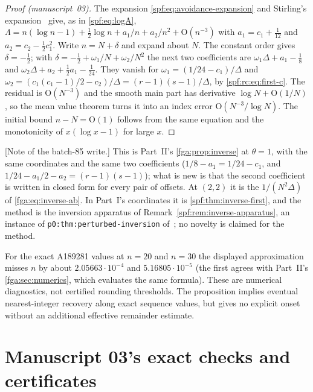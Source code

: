 \documentclass[11pt]{article}
\numberwithin{equation}{section}
\theoremstyle{definition}
\theoremstyle{remark}
\theoremstyle{definition}
\newcommand{\bigO}{\mathrm O}
\begin{document}
\begin{proof}[Proof (manuscript~03)]
The expansion \eqref{spf:eq:avoidance-expansion} and Stirling's
expansion~\cite{dlmfGamma} give, as in \eqref{spf:eq:logA},
$\Lambda=n(\log n-1)+\frac12\log n+a_1/n+a_2/n^2+\bigO(n^{-3})$ with
$a_1=c_1+\frac1{12}$ and $a_2=c_2-\frac12c_1^2$. Write $n=N+\delta$ and
expand about $N$. The constant order gives $\delta=-\frac12$; with
$\delta=-\frac12+\omega_1/N+\omega_2/N^2$ the next two coefficients are
$\omega_1\Delta+a_1-\frac18$ and $\omega_2\Delta+a_2+\frac12a_1-\frac1{24}$.
They vanish for $\omega_1=(1/24-c_1)/\Delta$ and
$\omega_2=(c_1(c_1-1)/2-c_2)/\Delta=(r-1)(s-1)/\Delta$, by
\eqref{spf:rc:eq:first-c}. The residual is $\bigO(N^{-3})$ and the smooth
main part has derivative $\log N+\bigO(1/N)$, so the mean value theorem turns
it into an index error $\bigO(N^{-3}/\log N)$. The initial bound
$n-N=\bigO(1)$ follows from the same equation and the monotonicity of
$x(\log x-1)$ for large $x$.
\end{proof}

[Note of the batch-85 write.] This is Part~II's \cref{fga:prop:inverse} at
$\theta=1$, with the same coordinates and the same two coefficients
($1/8-a_1=1/24-c_1$, and $1/24-a_1/2-a_2=(r-1)(s-1)$); what is new is that
the second coefficient is written in closed form for every pair of offsets.
At $(2,2)$ it is the $1/(N^2\Delta)$ of \eqref{fga:eq:inverse-ab}. In Part~I's
coordinates it is \cref{spf:thm:inverse-first}, and the method is the
inversion apparatus of Remark~\ref{spf:rem:inverse-apparatus}, an instance of
\texttt{p0:thm:perturbed-inversion} of~\cite{tai}; no novelty is claimed for
the method.

For the exact A189281 values at $n=20$ and $n=30$ the displayed
approximation misses $n$ by about $2.05663\cdot10^{-4}$ and
$5.16805\cdot10^{-5}$ (the first agrees with Part~II's
\cref{fga:sec:numerics}, which evaluates the same formula). These are
numerical diagnostics, not certified rounding thresholds. The proposition
implies eventual nearest-integer recovery along exact sequence values, but
gives no explicit onset without an additional effective remainder estimate.

\section{Manuscript 03's exact checks and certificates}
\label{spf:rc:sec:verification}
\end{document}
